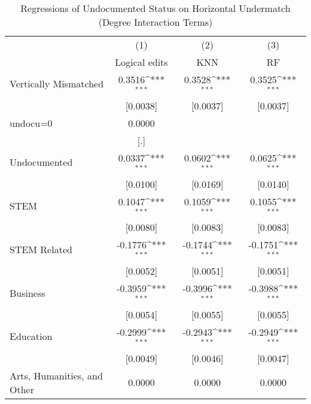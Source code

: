 \begin{table}[htbp]\centering
\def\sym#1{\ifmmode^{#1}\else\(^{#1}\)\fi}
\caption{Regressions of Undocumented Status on Horizontal Undermatch (Degree Interaction Terms)}
\begin{tabular}{l*{3}{c}}
\toprule
                    &\multicolumn{1}{c}{(1)}         &\multicolumn{1}{c}{(2)}         &\multicolumn{1}{c}{(3)}         \\
                    &Logical edits         &         KNN         &          RF         \\
\midrule
Vertically Mismatched&      0.3516\sym{***}&      0.3528\sym{***}&      0.3525\sym{***}\\
                    &    [0.0038]         &    [0.0037]         &    [0.0037]         \\
\addlinespace
undocu=0            &      0.0000         &                     &                     \\
                    &         [.]         &                     &                     \\
\addlinespace
Undocumented        &      0.0337\sym{***}&      0.0602\sym{***}&      0.0625\sym{***}\\
                    &    [0.0100]         &    [0.0169]         &    [0.0140]         \\
\addlinespace
STEM                &      0.1047\sym{***}&      0.1059\sym{***}&      0.1055\sym{***}\\
                    &    [0.0080]         &    [0.0083]         &    [0.0083]         \\
\addlinespace
STEM Related        &     -0.1776\sym{***}&     -0.1744\sym{***}&     -0.1751\sym{***}\\
                    &    [0.0052]         &    [0.0051]         &    [0.0051]         \\
\addlinespace
Business            &     -0.3959\sym{***}&     -0.3996\sym{***}&     -0.3988\sym{***}\\
                    &    [0.0054]         &    [0.0055]         &    [0.0055]         \\
\addlinespace
Education           &     -0.2999\sym{***}&     -0.2943\sym{***}&     -0.2949\sym{***}\\
                    &    [0.0049]         &    [0.0046]         &    [0.0047]         \\
\addlinespace
Arts, Humanities, and Other&      0.0000         &      0.0000         &      0.0000         \\

\end{tabular}
\end{table}
